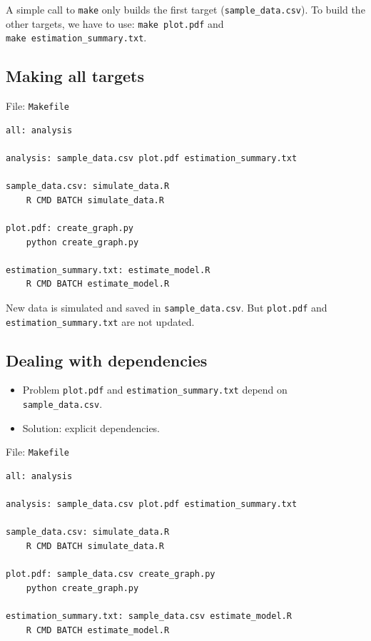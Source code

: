 \documentclass[]{book}
\providecommand{\tightlist}{%
  \setlength{\itemsep}{0pt}\setlength{\parskip}{0pt}}
\theoremstyle{definition}
\theoremstyle{definition}
\theoremstyle{definition}
\theoremstyle{remark}
\begin{document}
A simple call to \texttt{make} only builds the first target
(\texttt{sample\_data.csv}). To build the other targets, we have to use:
\texttt{make\ plot.pdf} and \texttt{make\ estimation\_summary.txt}.

\subsection{Making all targets}\label{making-all-targets}

File: \texttt{Makefile}

\begin{verbatim}
all: analysis

analysis: sample_data.csv plot.pdf estimation_summary.txt

sample_data.csv: simulate_data.R
    R CMD BATCH simulate_data.R

plot.pdf: create_graph.py
    python create_graph.py

estimation_summary.txt: estimate_model.R
    R CMD BATCH estimate_model.R
\end{verbatim}

New data is simulated and saved in \texttt{sample\_data.csv}. But
\texttt{plot.pdf} and \texttt{estimation\_summary.txt} are not updated.

\subsection{Dealing with dependencies}\label{dealing-with-dependencies}

\begin{itemize}
\tightlist
\item
  Problem \texttt{plot.pdf} and \texttt{estimation\_summary.txt} depend
  on \texttt{sample\_data.csv}.
\item
  Solution: explicit dependencies.
\end{itemize}

File: \texttt{Makefile}

\begin{verbatim}
all: analysis

analysis: sample_data.csv plot.pdf estimation_summary.txt

sample_data.csv: simulate_data.R
    R CMD BATCH simulate_data.R

plot.pdf: sample_data.csv create_graph.py
    python create_graph.py

estimation_summary.txt: sample_data.csv estimate_model.R
    R CMD BATCH estimate_model.R
\end{verbatim}
\end{document}
